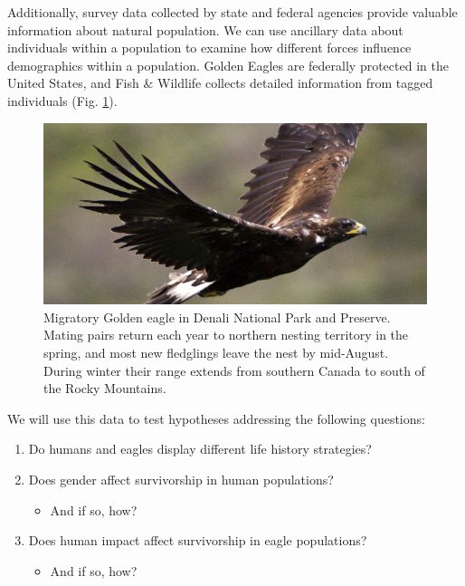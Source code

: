 \documentclass[]{book}
\providecommand{\tightlist}{%
  \setlength{\itemsep}{0pt}\setlength{\parskip}{0pt}}
\theoremstyle{definition}
\theoremstyle{definition}
\theoremstyle{definition}
\theoremstyle{remark}
\begin{document}
Additionally, survey data collected by state and federal agencies
provide valuable information about natural population. We can use
ancillary data about individuals within a population to examine how
different forces influence demographics within a population. Golden
Eagles are federally protected in the United States, and Fish \&
Wildlife collects detailed information from tagged individuals (Fig.
\ref{fig:eagle-fig}).

\begin{figure}
\centering
\includegraphics{chapter_materials/population_ecology/golden_eagle.jpg}
\caption{\label{fig:eagle-fig}Migratory Golden eagle in Denali National Park
and Preserve. Mating pairs return each year to northern nesting
territory in the spring, and most new fledglings leave the nest by
mid-August. During winter their range extends from southern Canada to
south of the Rocky Mountains\citep{brown_patterns_2017}.}
\end{figure}

We will use this data to test hypotheses addressing the following
questions:

\begin{enumerate}
\def\labelenumi{\arabic{enumi}.}
\tightlist
\item
  Do humans and eagles display different life history strategies?
\item
  Does gender affect survivorship in human populations?

  \begin{itemize}
  \tightlist
  \item
    And if so, how?
  \end{itemize}
\item
  Does human impact affect survivorship in eagle populations?

  \begin{itemize}
  \tightlist
  \item
    And if so, how?
  \end{itemize}
\end{enumerate}
\end{document}

